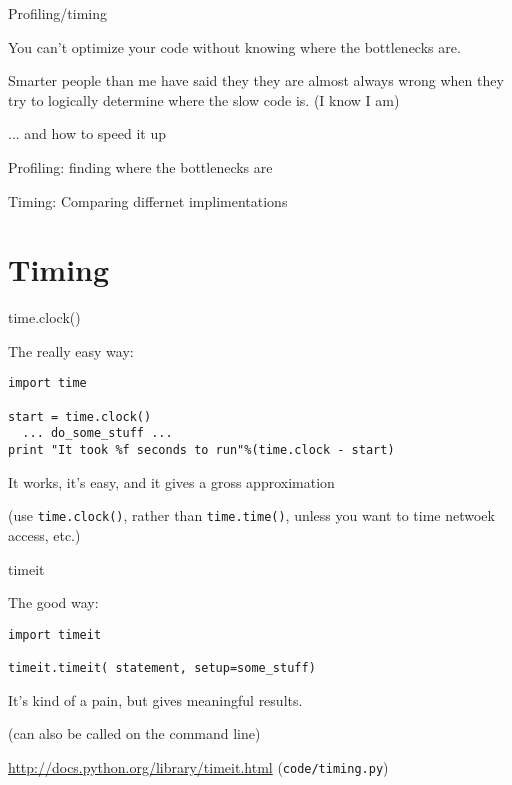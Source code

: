 \documentclass{beamer}
\begin{document}
\begin{frame}[fragile]{Profiling/timing}

\vfill
{\Large You can't optimize your code without knowing where the bottlenecks are.}

\vfill
{\Large Smarter people than me have said they they are almost always wrong
when they try to logically determine where the slow code is. (I know I am)}

\vfill
{\Large ... and how to speed it up}

\vfill
{\Large Profiling: finding where the bottlenecks are}

\vfill
{\Large Timing: Comparing differnet implimentations}

\end{frame} 


\section{Timing}

\begin{frame}[fragile]{time.clock()}

{\Large The really easy way:}

\begin{verbatim}
import time

start = time.clock()
  ... do_some_stuff ...
print "It took %f seconds to run"%(time.clock - start)
\end{verbatim}

{\Large It works, it's easy, and it gives a gross approximation}

\vfill
(use \verb|time.clock()|, rather than \verb|time.time()|, unless you want to time netwoek access, etc.)

\end{frame} 

\begin{frame}[fragile]{timeit}

{\Large The good way:}

\begin{verbatim}
import timeit

timeit.timeit( statement, setup=some_stuff)

\end{verbatim}

{\Large It's kind of a pain, but gives meaningful results.}

(can also be called on the command line)

\vfill
\url{http://docs.python.org/library/timeit.html}
\vfill
(\verb|code/timing.py|)
\end{frame} 
\end{document}
